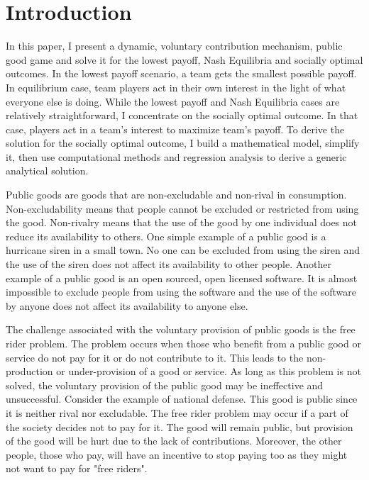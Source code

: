 \section{Introduction}

	In this paper, I present a dynamic, voluntary contribution mechanism, public good game and solve it for the lowest payoff, Nash Equilibria and socially optimal outcomes. In the lowest payoff scenario, a team gets the smallest possible payoff. In equilibrium case, team players act in their own interest in the light of what everyone else is doing. While the lowest payoff and Nash Equilibria cases are relatively straightforward, I concentrate on the socially optimal outcome. In that case, players act in a team's interest to maximize team's payoff. To derive the solution for the socially optimal outcome, I build a mathematical model, simplify it, then use computational methods and regression analysis to derive a generic analytical solution.

	Public goods are goods that are non-excludable and non-rival in consumption. Non-excludability means that people cannot be excluded or restricted from using the good. Non-rivalry means that the use of the good by one individual does not reduce its availability to others. One simple example of a public good is a hurricane siren in a small town. No one can be excluded from using the siren and the use of the siren does not affect its availability to other people. Another example of a public good is an open sourced, open licensed software. It is almost impossible to exclude people from using the software and the use of the software by anyone does not affect its availability to anyone else.
	
	The challenge associated with the voluntary provision of public goods is the free rider problem. The problem occurs when those who benefit from a public good or service do not pay for it or do not contribute to it. This leads to the non-production or under-provision of a good or service. As long as this problem is not solved, the voluntary provision of the public good may be ineffective and unsuccessful. Consider the example of national defense. This good is public since it is neither rival nor excludable. The free rider problem may occur if a part of the society decides not to pay for it. The good will remain public, but provision of the good will be hurt due to the lack of contributions. Moreover, the other people, those who pay, will have an incentive to stop paying too as they might not want to pay for "free riders".
	
